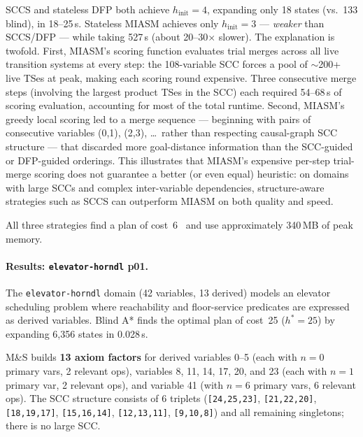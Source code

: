 \documentclass[11pt,a4paper]{article}
\begin{document}
    SCCS and stateless DFP both achieve $h_{\mathrm{init}} = 4$, expanding
    only 18 states (vs.\ 133 blind), in 18--25\,s.  Stateless MIASM
    achieves only $h_{\mathrm{init}} = 3$ — \emph{weaker} than SCCS/DFP
    — while taking 527\,s (about 20--30$\times$ slower).  The explanation
    is twofold.  First, MIASM's scoring function evaluates trial merges
    across all live transition systems at every step: the 108-variable SCC
    forces a pool of $\sim$200+ live TSes at peak, making each scoring
    round expensive.  Three consecutive merge steps (involving the largest
    product TSes in the SCC) each required 54--68\,s of scoring evaluation,
    accounting for most of the total runtime.  Second, MIASM's greedy
    local scoring led to a merge sequence — beginning with pairs of
    consecutive variables (0,1), (2,3), \ldots\ rather than respecting
    causal-graph SCC structure — that discarded more goal-distance
    information than the SCC-guided or DFP-guided orderings.  This
    illustrates that MIASM's expensive per-step trial-merge scoring does
    not guarantee a better (or even equal) heuristic: on domains with
    large SCCs and complex inter-variable dependencies, structure-aware
    strategies such as SCCS can outperform MIASM on both quality and speed.

    All three strategies find a plan of cost~6~\checkmark{} and use
    approximately 340\,MB of peak memory.

    \paragraph{Results: \texttt{elevator-horndl} p01.}

    The \texttt{elevator-horndl} domain (42 variables, 13 derived) models an
    elevator scheduling problem where reachability and floor-service predicates
    are expressed as derived variables.  Blind A* finds the optimal plan of
    cost~25 ($h^* = 25$) by expanding 6{,}356 states in 0.028\,s.

    M\&S builds \textbf{13 axiom factors} for derived variables 0--5 (each
    with $n = 0$ primary vars, 2 relevant ops), variables 8, 11, 14, 17, 20,
    and 23 (each with $n = 1$ primary var, 2 relevant ops), and variable 41
    (with $n = 6$ primary vars, 6 relevant ops).  The SCC structure consists
    of 6 triplets (\texttt{[24,25,23]}, \texttt{[21,22,20]}, \texttt{[18,19,17]},
    \texttt{[15,16,14]}, \texttt{[12,13,11]}, \texttt{[9,10,8]}) and all
    remaining singletons; there is no large SCC.
\end{document}
